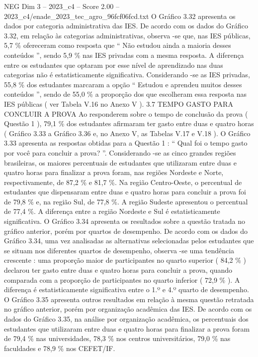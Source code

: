 \begin{textsample}{NEG Dim 3 – 2023\_c4 – Score 2.00 – 2023\_c4/enade\_2023\_tec\_agro\_96fcf06fcd.txt}
O Gráfico 3.32 apresenta os dados por categoria administrativa das IES.
De acordo com os dados do Gráfico 3.32, em relação às categorias administrativas, observa -se que, nas IES públicas, 5,7 \% ofereceram como resposta que “ Não estudou ainda a maioria desses conteúdos ”, sendo 5,9 \% nas IES privadas com a mesma resposta.
A diferença entre os estudantes que optaram por esse nível de aprendizado nas duas categorias não é estatisticamente significativa.
Considerando -se as IES privadas, 55,8 \% dos estudantes marcaram a opção “ Estudou e aprendeu muitos desses conteúdos ”, sendo de 55,0 \% a proporção dos que escolheram essa resposta nas IES públicas ( ver Tabela V.16 no Anexo V ). 3.7 TEMPO GASTO PARA CONCLUIR A PROVA Ao responderem sobre o tempo de conclusão da prova ( Questão 1 ), 79,1 \% dos estudantes afirmaram ter gasto entre duas e quatro horas ( Gráfico 3.33 a Gráfico 3.36 e, no Anexo V, as Tabelas V.17 e V.18 ).
O Gráfico 3.33 apresenta as respostas obtidas para a Questão 1 : “ Qual foi o tempo gasto por você para concluir a prova? ”.
Considerando -se as cinco grandes regiões brasileiras, os maiores percentuais de estudantes que utilizaram entre duas e quatro horas para finalizar a prova foram, nas regiões Nordeste e Norte, respectivamente, de 87,2 \% e 81,7 \%.
Na região Centro-Oeste, o percentual de estudantes que dispensaram entre duas e quatro horas para concluir a prova foi de 79,8 \% e, na região Sul, de 77,8 \%.
A região Sudeste apresentou o percentual de 77,4 \%.
A diferença entre a região Nordeste e Sul é estatisticamente significativa.
O Gráfico 3.34 apresenta os resultados sobre a questão tratada no gráfico anterior, porém por quartos de desempenho.
De acordo com os dados do Gráfico 3.34, uma vez analisadas as alternativas selecionadas pelos estudantes que se situam nos diferentes quartos de desempenho, observa -se uma tendência crescente : uma proporção maior de participantes no quarto superior ( 84,2 \% ) declarou ter gasto entre duas e quatro horas para concluir a prova, quando comparada com a proporção de participantes no quarto inferior ( 72,9 \% ).
A diferença é estatisticamente significativa entre o 1.º e 4.º quarto de desempenho.
O Gráfico 3.35 apresenta outros resultados em relação à mesma questão retratada no gráfico anterior, porém por organização acadêmica das IES.
De acordo com os dados do Gráfico 3.35, na análise por organização acadêmica, os percentuais dos estudantes que utilizaram entre duas e quatro horas para finalizar a prova foram de 79,4 \% nas universidades, 78,3 \% nos centros universitários, 79,0 \% nas faculdades e 78,9 \% nos CEFET/IF.

\end{textsample}
